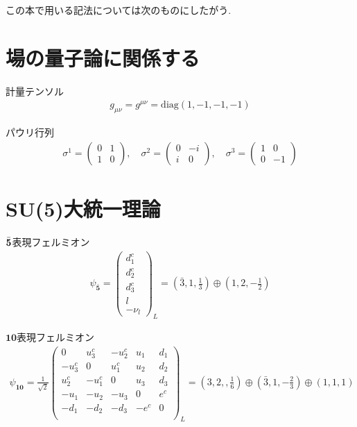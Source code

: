 %
%
この本で用いる記法については次のものにしたがう.
\section{場の量子論に関係する}
計量テンソル
\begin{align}
  g_{\mu\nu} = g^{\mu\nu} = \mathrm{diag}(1, -1, -1, -1)
\end{align}

パウリ行列
\begin{align}
  \sigma ^1 = \left(\begin{array}{cc}
        0 & 1 \\
        1 & 0 
      \end{array}\right),\quad
  \sigma ^2 = \left(\begin{array}{cc}
        0 & -i \\
        i &  0 
      \end{array}\right),\quad
  \sigma ^3 = \left(\begin{array}{cc}
        1 & 0 \\
        0 & -1 
      \end{array}\right)
\end{align}

\section{SU(5)大統一理論}

$\bar{\bf{5}}$表現フェルミオン
\begin{align}
  \psi_{\bar{\bm{5}}} =\begin{pmatrix}
    d_1 ^c \\
    d_2 ^c \\
    d_3 ^c \\
    l      \\
    -\nu_l
  \end{pmatrix}_L
  =\left(\bar{3},1,\frac{1}{3}\right)\oplus \left(1,2,-\frac{1}{2}\right)
\end{align}

$\bm{10}$表現フェルミオン
\begin{align}
  \psi_{{\bm{10}}} = \frac{1}{\sqrt{2}}\begin{pmatrix}
         0 &  u_3^c & -u_2^c & u_1 & d_1 \\
    -u_3^c &      0 &  u_1^c & u_2 & d_2 \\
     u_2^c & -u_1^c &      0 & u_3 & d_3 \\
    -u_1   &   -u_2 &   -u_3 &   0 & e^c \\
      -d_1 &   -d_2 &   -d_3 &-e^c &   0 \\
    \end{pmatrix}_L = (3,2,,\frac{1}{6})\oplus(\bar{3},1,-\frac{2}{3})\oplus(1,1,1)
\end{align}

